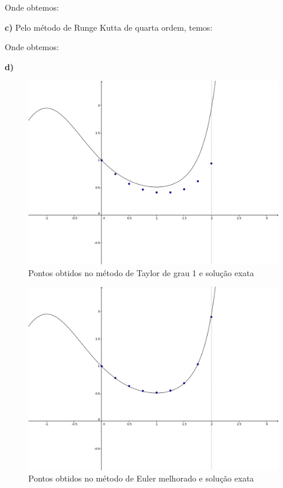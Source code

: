 \documentclass[paper=a4, fontsize=12pt]{scrartcl}
\numberwithin{equation}{section} %
\numberwithin{figure}{section} %
\numberwithin{table}{section} %
\begin{document}
		\hspace{2cm}

		

		Onde obtemos:


		\textbf{c)} Pelo método de Runge Kutta de quarta ordem, temos:

		\hspace{2cm}

		

		Onde obtemos:


		\textbf{d)}

 		\begin{figure}[H]
 			\centering
 			\includegraphics[scale=0.25]{grafedo1.png}
 			\caption{Pontos obtidos no método de Taylor de grau 1 e solução exata}
 		\end{figure}

 		\begin{figure}[H]
 			\centering
 			\includegraphics[scale=0.25]{grafedo2.png}
 			\caption{Pontos obtidos no método de Euler melhorado e solução exata}
 		\end{figure}
\end{document}
